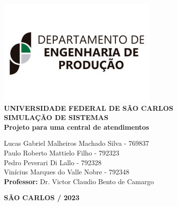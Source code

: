 \justifying %
\onehalfspacing %
\setlength{\parindent}{0cm}  %
\renewcommand*\familydefault{\rmdefault}
\thispagestyle{empty}
\begin{center}
\includegraphics[scale=0.6]{capa/logo-dep.jpg}\\
\vspace*{.8cm}
{\huge \textbf{UNIVERSIDADE FEDERAL DE SÃO CARLOS}}\\
\vspace*{.8cm}
{\Large \textbf{SIMULAÇÃO DE SISTEMAS}}\\
\vspace*{3cm}
{\Large \textbf{Projeto para uma central de atendimentos}}\\
\vspace*{4.5cm}
\begin{flushright}
    \onehalfspacing
    {\Large  Lucas Gabriel Malheiros Machado Silva - 769837}\\
    {\Large  Paulo Roberto Mattielo Filho - 792323}\\
    {\Large  Pedro Peverari Di Lallo - 792328}\\
    {\Large  Vinícius Marques do Valle Nobre - 792348}\\
    \vspace*{.3cm}
    {\Large \textbf{Professor:}}
    {\Large Dr. Victor Claudio Bento de Camargo}\\
\end{flushright}
\vspace*{\fill}
{\large \bf SÃO CARLOS / 2023}
\end{center}

